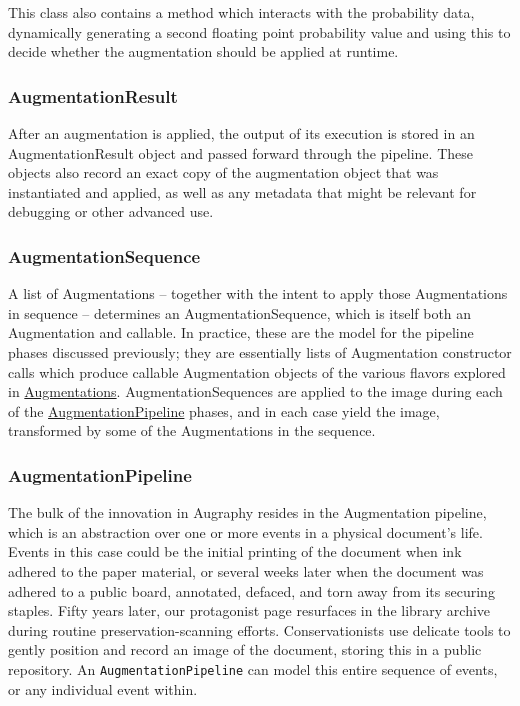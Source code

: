 \documentclass[runningheads]{article}
\begin{document}
This class also contains a method which interacts with the probability data, dynamically generating a second floating point probability value and using this to decide whether the augmentation should be applied at runtime.

\subsubsection{AugmentationResult}
\label{sec:org6aeadfa}
After an augmentation is applied, the output of its execution is stored in an AugmentationResult object and passed forward through the pipeline. These objects also record an exact copy of the augmentation object that was instantiated and applied, as well as any metadata that might be relevant for debugging or other advanced use.

\subsubsection{AugmentationSequence}
\label{sec:org0192f11}
A list of Augmentations -- together with the intent to apply those Augmentations in sequence -- determines an AugmentationSequence, which is itself both an Augmentation and callable. In practice, these are the model for the pipeline phases discussed previously; they are essentially lists of Augmentation constructor calls which produce callable Augmentation objects of the various flavors explored in \hyperref[sec:orgea493da]{Augmentations}. AugmentationSequences are applied to the image during each of the \hyperref[sec:org6690404]{AugmentationPipeline} phases, and in each case yield the image, transformed by some of the Augmentations in the sequence.

\subsubsection{AugmentationPipeline}
\label{sec:org6690404}
The bulk of the innovation in Augraphy resides in the Augmentation pipeline, which is an abstraction over one or more events in a physical document's life. Events in this case could be the initial printing of the document when ink adhered to the paper material, or several weeks later when the document was adhered to a public board, annotated, defaced, and torn away from its securing staples. Fifty years later, our protagonist page resurfaces in the library archive during routine preservation-scanning efforts. Conservationists use delicate tools to gently position and record an image of the document, storing this in a public repository. An \texttt{AugmentationPipeline} can model this entire sequence of events, or any individual event within.\\
\end{document}
